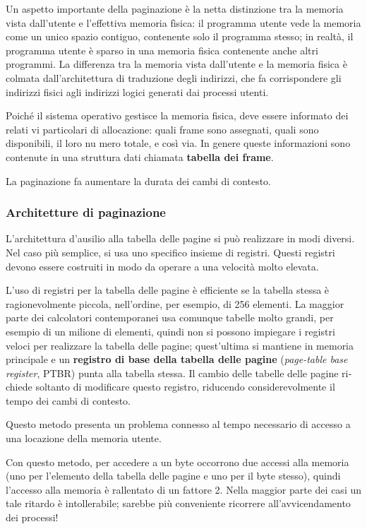\documentclass[11pt,a4paper]{article}
\begin{document}
Un aspetto importante della paginazione è la netta distinzione tra la memoria vista dal­l'utente e l'effettiva memoria fìsica: il programma utente vede la memoria come un unico
spazio contiguo, contenente solo il programma stesso; in realtà, il programma utente è sparso in una memoria fisica contenente anche altri programmi. La differenza tra la memoria vi­sta dall'utente e la memoria fisica è colmata dall'architettura di traduzione degli indirizzi, che
fa corrispondere gli indirizzi fisici agli indirizzi logici generati dai processi utenti.

Poiché il sistema operativo gestisce la memoria fisica, deve essere informato dei relati­
vi particolari di allocazione: quali frame sono assegnati, quali sono disponibili, il loro nu­
mero totale, e così via. In genere queste informazioni sono contenute in una struttura dati
chiamata \textbf{tabella dei frame}.

La paginazione fa aumentare la durata dei cambi di contesto.

\subsubsection{Architetture di paginazione}
L'architettura d'ausilio alla tabella delle pagine si può realizzare in modi diversi. Nel
caso più semplice, si usa uno specifico insieme di registri. Questi registri devono essere costruiti in modo da ope­rare a una velocità molto elevata.

L'uso di registri per la tabella delle pagine è efficiente se la tabella stessa è ragionevol­mente piccola, nell'ordine, per esempio, di 256 elementi. La maggior parte dei calcolatori
contemporanei usa comunque tabelle molto grandi, per esempio di un milione di elementi,
quindi non si possono impiegare i registri veloci per realizzare la tabella delle pagine; que­st'ultima si mantiene in memoria principale e un \textbf{registro di base della tabella delle pagine}
(\emph{page-table base register}, PTBR) punta alla tabella stessa. Il cambio delle tabelle delle pagine ri­chiede soltanto di modificare questo registro, riducendo considerevolmente il tempo dei
cambi di contesto.

Questo metodo presenta un problema connesso al tempo necessario di accesso a una
locazione della memoria utente.

Con questo metodo, per accedere a un byte occorro­no due accessi alla memoria (uno per l'elemento della tabella delle pagine e uno per il byte
stesso), quindi l'accesso alla memoria è rallentato di un fattore 2. Nella maggior parte dei ca­si un tale ritardo è intollerabile; sarebbe più conveniente ricorrere all'avvicendamento dei
processi!
\end{document}
